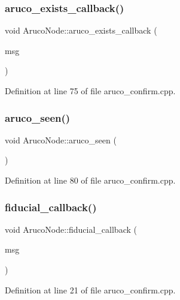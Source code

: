 \subsubsection{\texorpdfstring{aruco\+\_\+exists\+\_\+callback()}{aruco\_exists\_callback()}}
{\footnotesize\ttfamily void Aruco\+Node\+::aruco\+\_\+exists\+\_\+callback (\begin{DoxyParamCaption}\item[{const fiducial\+\_\+msgs\+::\+Fiducial\+Transform\+Array\+::\+Const\+Ptr \&}]{msg }\end{DoxyParamCaption})}



Definition at line 75 of file aruco\+\_\+confirm.\+cpp.

\mbox{\label{class_aruco_node_a21fe5af1a16e884424a4065ca6dd608f}} 
\subsubsection{\texorpdfstring{aruco\+\_\+seen()}{aruco\_seen()}}
{\footnotesize\ttfamily void Aruco\+Node\+::aruco\+\_\+seen (\begin{DoxyParamCaption}{ }\end{DoxyParamCaption})}



Definition at line 80 of file aruco\+\_\+confirm.\+cpp.

\mbox{\label{class_aruco_node_af68c583d73a36c483d28b96a6fd22713}} 
\subsubsection{\texorpdfstring{fiducial\+\_\+callback()}{fiducial\_callback()}}
{\footnotesize\ttfamily void Aruco\+Node\+::fiducial\+\_\+callback (\begin{DoxyParamCaption}\item[{const fiducial\+\_\+msgs\+::\+Fiducial\+Transform\+Array\+::\+Const\+Ptr \&}]{msg }\end{DoxyParamCaption})}



Definition at line 21 of file aruco\+\_\+confirm.\+cpp.

